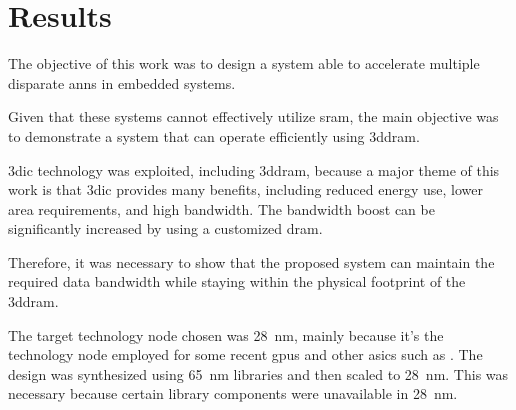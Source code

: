 
\chapter{Results}
\label{sec:Results}
The objective of this work was to design a system able to accelerate multiple disparate \acp{ann} in embedded systems.
\iffalse
This means systems that are not designed to process multiple requests of essentially the same operation.
\fi
Given that these systems cannot effectively utilize \ac{sram}, the main objective was to demonstrate a system that can operate efficiently using \ac{3ddram}.
\iffalse
The implemented system decodes instructions, sends configuration to various functions, pre-fetches and pipelines data.
This parallelism allows the system to constantly stream data while results from previous operations are being processed.
\fi

\ac{3dic} technology was exploited, including \ac{3ddram}, because a major theme of this work is that \ac{3dic} provides many benefits, including reduced energy use, lower area requirements, and high bandwidth. 
The bandwidth boost can be significantly increased by using a customized \ac{dram}.
\iffalse
To demonstrate such a system, this work targeted \ac{3dic} technology including \ac{3ddram}. This work proposes that if a system can be purely in \ac{3dic}, the system can take advantage of the benefits
of \ac{3dic} which includes reduced energy, area and high bandwidth.
In addition, this work proposes that given the system is \ac{3dic}, then a customized \ac{dram} would provide a significant bandwidth boost over typical implementations using standard DRAM.
\fi
\iffalse
To maintain a purely \ac{3dic} architecture, the area of the system Manager and Processing Engine had to stay within the physical footprint of the \ac{3ddram}.
\fi
Therefore, it was necessary to show that the proposed system can maintain the required data bandwidth while staying within the physical footprint of the \ac{3ddram}. 


The target technology node chosen was \SI{28}{\nano\meter}, mainly because it's the technology node employed for some recent \acp{gpu} and other \acp{asic} such as \cite{jouppi2017datacenter}.
The design was synthesized using \SI{65}{\nano\meter} libraries and then scaled to \SI{28}{\nano\meter}.  This was necessary because certain library components were unavailable
in \SI{28}{\nano\meter}.

